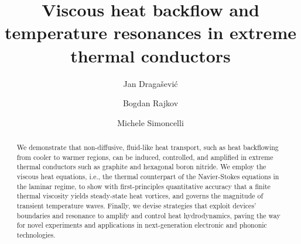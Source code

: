 \documentclass[
prb,
twocolumn,
superscriptaddress,
 amsmath,amssymb,
 aps,
longbibliography,
]{revtex4-2}
\begin{document}
\title{Viscous heat backflow and temperature resonances in extreme thermal conductors}


\author{Jan Dragašević}


\author{Bogdan Rajkov}

\author{Michele Simoncelli}



\begin{abstract}
We demonstrate that non-diffusive, fluid-like heat transport, such as heat backflowing from cooler to warmer regions, can be induced, controlled, and amplified in extreme thermal conductors such as graphite and hexagonal boron nitride. We employ the viscous heat equations, i.e., the thermal counterpart of the Navier-Stokes equations in the laminar regime, to show with first-principles quantitative accuracy that a finite thermal viscosity yields steady-state heat vortices, and governs the magnitude of transient temperature waves. Finally, we devise strategies that exploit devices' boundaries and resonance to amplify and control heat hydrodynamics, paving the way for novel experiments and applications in next-generation electronic and phononic technologies.
\end{abstract}

\maketitle
\end{document}
